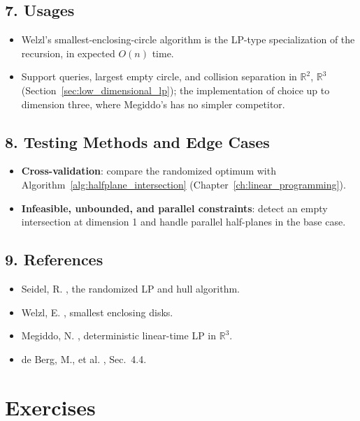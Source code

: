 \subsection{7. Usages}

\begin{itemize}
\item Welzl's smallest-enclosing-circle algorithm \cite{welzl1991} is the
  LP-type specialization of the recursion, in expected $O(n)$ time.
\item Support queries, largest empty circle, and collision separation in
  $\mathbb{R}^2$, $\mathbb{R}^3$ (Section~\ref{sec:low_dimensional_lp}); the
  implementation of choice up to dimension three, where Megiddo's
  \cite{megiddo1983} has no simpler competitor.
\end{itemize}

\subsection{8. Testing Methods and Edge Cases}

\begin{itemize}
\item \textbf{Cross-validation}: compare the randomized optimum with
  Algorithm~\ref{alg:halfplane_intersection} (Chapter~\ref{ch:linear_programming}).
\item \textbf{Infeasible, unbounded, and parallel constraints}: detect an empty
  intersection at dimension 1 and handle parallel half-planes in the base case.
\end{itemize}

\subsection{9. References}

\begin{itemize}
\item Seidel, R. \cite{seidel1990}, the randomized LP and hull algorithm.
\item Welzl, E. \cite{welzl1991}, smallest enclosing disks.
\item Megiddo, N. \cite{megiddo1983}, deterministic linear-time LP in
  $\mathbb{R}^3$.
\item de Berg, M., et al. \cite{deberg2008}, Sec.~4.4.
\end{itemize}

\section{Exercises}
\label{sec:randomized_exercises}

